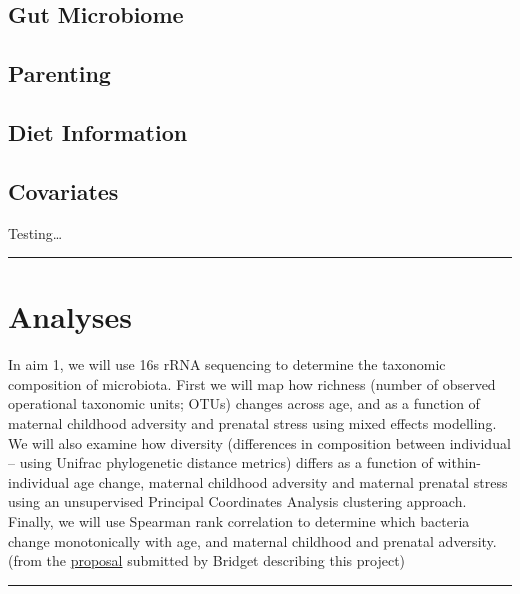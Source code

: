 \documentclass[
]{book}
\begin{document}
\hypertarget{gut-microbiome}{%
\subsection{Gut Microbiome}\label{gut-microbiome}}

\hypertarget{parenting}{%
\subsection{Parenting}\label{parenting}}

\hypertarget{diet-information}{%
\subsection{Diet Information}\label{diet-information}}

\hypertarget{covariates}{%
\subsection{Covariates}\label{covariates}}

Testing\ldots{}

\begin{center}\rule{0.5\linewidth}{0.5pt}\end{center}

\hypertarget{analyses}{%
\section{Analyses}\label{analyses}}

In aim 1, we will use 16s rRNA sequencing to determine the taxonomic composition of microbiota. First we will map how richness (number of observed operational taxonomic units; OTUs) changes across age, and as a function of maternal childhood adversity and prenatal stress using mixed effects modelling. We will also examine how diversity (differences in composition between individual -- using Unifrac phylogenetic distance metrics) differs as a function of within-individual age change, maternal childhood adversity and maternal prenatal stress using an unsupervised Principal Coordinates Analysis clustering approach. Finally, we will use Spearman rank correlation to determine which bacteria change monotonically with age, and maternal childhood and prenatal adversity. (from the \href{https://ucla.app.box.com/file/740587024475}{proposal} submitted by Bridget describing this project)

\begin{center}\rule{0.5\linewidth}{0.5pt}\end{center}

  
\end{document}
